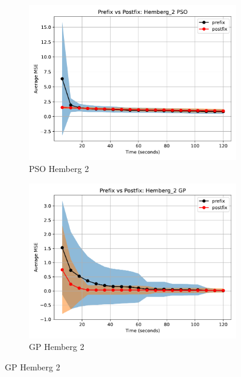\documentclass[12pt]{iopart}
\begin{document}
\begin{figure}
    \vspace{0.5cm}
    
    \begin{subfigure}[b]{0.4\textwidth}
        \includegraphics[width=\linewidth, keepaspectratio]{Hemberg_Benchmarks/PrePostHemberg_2PSO.pdf}
        \caption{PSO Hemberg 2}
        \label{subfig:hemberg_2_PSO}
    \end{subfigure}
    \begin{subfigure}[b]{0.4\textwidth}
        \includegraphics[width=\linewidth, keepaspectratio]{Hemberg_Benchmarks/PrePostHemberg_2GP.pdf}
        \caption{GP Hemberg 2}
        \label{subfig:hemberg_2_GP}
    \end{subfigure}
    

\end{figure}
\end{document}

